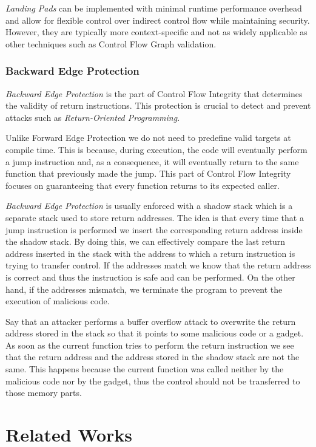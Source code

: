 \textit{Landing Pads} can be implemented with minimal runtime performance overhead
and allow for flexible control over indirect control flow while maintaining security.
However, they are typically more context-specific and not as widely applicable as
other techniques such as Control Flow Graph validation.

\subsubsection{Backward Edge Protection}
\label{subsubsec:background_backward}

\textit{Backward Edge Protection} is the part of Control Flow Integrity that determines
the validity of return instructions. This protection is crucial to detect and
prevent attacks such as \textit{Return-Oriented Programming}.

Unlike Forward Edge Protection we do not need to predefine valid targets at compile
time. This is because, during execution, the code will eventually perform a jump
instruction and, as a consequence, it will eventually return to the same
function that previously made the jump. This part of Control Flow Integrity focuses
on guaranteeing that every function returns to its expected caller.

\textit{Backward Edge Protection} is usually enforced with a shadow stack which
is a separate stack used to store return addresses. The idea is that every time that
a jump instruction is performed we insert the corresponding return address inside
the shadow stack. By doing this, we can effectively compare the last return address
inserted in the stack with the address to which a return instruction is trying to
transfer control. If the addresses match we know that the return address is
correct and thus the instruction is safe and can be performed. On the other hand,
if the addresses mismatch, we terminate the program to prevent the execution of malicious
code.

Say that an attacker performs a buffer overflow attack to overwrite the return address
stored in the stack so that it points to some malicious code or a gadget. As
soon as the current function tries to perform the return instruction we see that
the return address and the address stored in the shadow stack are not the same. This
happens because the current function was called neither by the malicious code nor
by the gadget, thus the control should not be transferred to those memory parts.

\section{Related Works}
\label{sec:background_related}

